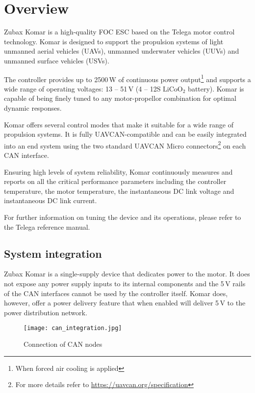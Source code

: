 \chapter{Overview}

Zubax Komar is a high-quality FOC ESC based on the Telega motor control technology. Komar is designed 
to support the propulsion systems of light unmanned aerial vehicles (UAVs), unmanned underwater vehicles (UUVs)
and unmanned surface vehicles (USVs).

The controller provides up to 2500\,W of continuous power output\footnote{When forced air cooling is applied} and
supports a wide range of operating voltages: 13 -- 51\,V (4 -- 12S $\text{LiCoO}_\text{2}$ battery).
Komar is capable of being finely tuned to any motor-propellor combination for optimal dynamic responses.

Komar offers several control modes that make it suitable for a wide range of propulsion systems.
It is fully UAVCAN-compatible and can be easily integrated into an end system using the two standard UAVCAN
Micro connectors\footnote{For more details refer to \url{https://uavcan.org/specification}} on each CAN
interface.

Ensuring high levels of system reliability, Komar continuously measures and reports on all the critical
performance parameters including the controller temperature, the motor temperature, the instantaneous
DC link voltage and instantaneous DC link current.

For further information on tuning the device and its operations, please refer to the Telega reference manual.

\section{System integration}
Zubax Komar is a single-supply device that dedicates power to the motor. It does not expose any power supply
inputs to its internal components and the 5\,V rails of the CAN interfaces cannot be used by the controller
itself. Komar does, however, offer a power delivery feature that when enabled will deliver 5\,V to the power
distribution network.

\begin{figure}[h]
    \centering
    \texttt{[image: can\_integration.jpg]}
    \caption{Connection of CAN nodes}
\end{figure}
